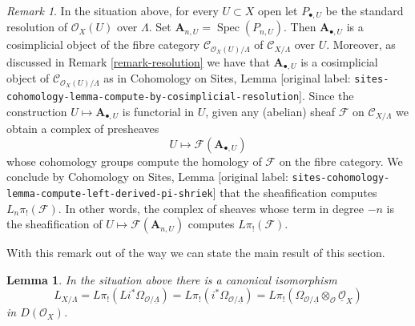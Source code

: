 \documentclass[10pt,a4paper]{article}
\theoremstyle{plain}
\newtheorem{lemma}[subsection]{Lemma}
\theoremstyle{definition}
\theoremstyle{remark}
\newtheorem{remark}[subsection]{Remark}
\numberwithin{equation}{subsection}
\def\Spec{\mathop{\mathrm{Spec}}}
\begin{document}
\begin{remark}
\label{remark-compute-L-pi-shriek}
In the situation above, for every $U \subset X$ open let
$P_{\bullet, U}$ be the standard resolution of $\mathcal{O}_X(U)$
over $\Lambda$. Set $\mathbf{A}_{n, U} = \Spec(P_{n, U})$. Then
$\mathbf{A}_{\bullet, U}$
is a cosimplicial object of the fibre category
$\mathcal{C}_{\mathcal{O}_X(U)/\Lambda}$ of
$\mathcal{C}_{X/\Lambda}$ over $U$. Moreover, as discussed
in Remark \ref{remark-resolution} we have that $\mathbf{A}_{\bullet, U}$
is a cosimplicial object of $\mathcal{C}_{\mathcal{O}_X(U)/\Lambda}$
as in Cohomology on Sites, Lemma
\textnormal{[original label: \nolinkurl{sites-cohomology-lemma-compute-by-cosimplicial-resolution}]}.
Since the construction $U \mapsto \mathbf{A}_{\bullet, U}$ is functorial
in $U$, given any (abelian) sheaf $\mathcal{F}$ on $\mathcal{C}_{X/\Lambda}$
we obtain a complex of presheaves
$$
U \longmapsto \mathcal{F}(\mathbf{A}_{\bullet, U})
$$
whose cohomology groups compute the homology of $\mathcal{F}$ on the fibre
category. We conclude by
Cohomology on Sites, Lemma
\textnormal{[original label: \nolinkurl{sites-cohomology-lemma-compute-left-derived-pi-shriek}]}
that the sheafification computes $L_n\pi_!(\mathcal{F})$.
In other words, the complex of sheaves whose term in degree $-n$ is
the sheafification of $U \mapsto \mathcal{F}(\mathbf{A}_{n, U})$ computes
$L\pi_!(\mathcal{F})$.
\end{remark}

\noindent
With this remark out of the way we can state the main
result of this section.

\begin{lemma}
\label{lemma-cotangent-morphism-schemes}
In the situation above there is a canonical isomorphism
$$
L_{X/\Lambda} = 
L\pi_!(Li^*\Omega_{\mathcal{O}/\underline{\Lambda}}) =
L\pi_!(i^*\Omega_{\mathcal{O}/\underline{\Lambda}}) =
L\pi_!(\Omega_{\mathcal{O}/\underline{\Lambda}}
\otimes_\mathcal{O} \underline{\mathcal{O}}_X)
$$
in $D(\mathcal{O}_X)$.
\end{lemma}
\end{document}
